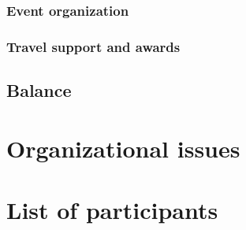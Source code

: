 \documentclass[11pt,a4paper]{article}
\begin{document}
  \subsubsection{Event organization}
  \subsubsection{Travel support and awards}
  \subsection{Balance}

\section{Organizational issues}

\section{List of participants}
\end{document}
